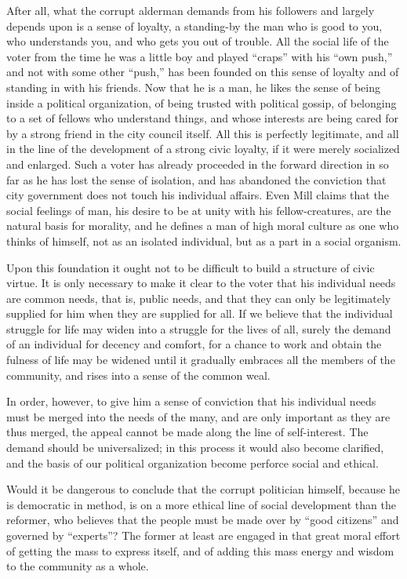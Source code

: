 \documentclass[]{article}
\begin{document}
\begin{sectionbody}
\addamsparagraph After all, what the corrupt alderman demands from his followers and
largely depends upon is a sense of loyalty, a standing-by the man who is
good to you, who understands you, and who gets you out of trouble. All
the social life of the voter from the time he was a little boy and
played ``craps'' with his ``own push,'' and not with some other ``push,'' has
been founded on this sense of loyalty and of standing in with his
friends. Now that he is a man, he likes the sense of being inside a
political organization, of being trusted with political gossip, of
belonging to a set of fellows who understand things, and whose interests
are being cared for by a strong friend in the city council itself. All
this is perfectly legitimate, and all in the line of the development of
a strong civic loyalty, if it were merely socialized and enlarged. Such
a voter has already proceeded in the forward direction in so far as he
has lost the sense of isolation, and has abandoned the conviction that
city government does not touch his individual affairs. Even Mill claims
that the social feelings of man, his desire to be at unity with his
fellow-creatures, are the natural basis for morality, and he defines a
man of high moral culture as one who thinks of himself, not as an
isolated individual, but as a part in a social organism.

\addamsparagraph Upon this foundation it ought not to be difficult to build a structure
of civic virtue. It is only necessary to make it clear to the voter that
his individual needs are common needs, that is, public needs, and that
they can only be legitimately supplied for him when they are supplied
for all. If we believe that the individual struggle for life may widen
into a struggle for the lives of all, surely the demand of an individual
for decency and comfort, for a chance to work and obtain the fulness of
life may be widened until it gradually embraces all the members of the
community, and rises into a sense of the common weal.

\addamsparagraph In order, however, to give him a sense of conviction that his individual
needs must be merged into the needs of the many, and are only important
as they are thus merged, the appeal cannot be made along the line of
self-interest. The demand should be universalized; in this process it
would also become clarified, and the basis of our political organization
become perforce social and ethical.

\addamsparagraph Would it be dangerous to conclude that the corrupt politician himself,
because he is democratic in method, is on a more ethical line of social
development than the reformer, who believes that the people must be made
over by ``good citizens'' and governed by ``experts''? The former at least
are engaged in that great moral effort of getting the mass to express
itself, and of adding this mass energy and wisdom to the community as a
whole.


\end{sectionbody}
\end{document}
